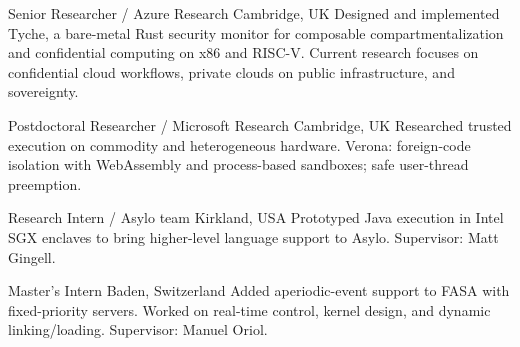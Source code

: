 

\cvposition
  {Senior Researcher / Azure Research}
  {Cambridge, UK}
  {}
  {Designed and implemented Tyche, a bare-metal Rust security monitor for composable
   compartmentalization and confidential computing on x86 and RISC-V.
   Current research focuses on confidential cloud workflows, private clouds on
   public infrastructure, and sovereignty.}

\cvposition
  {Postdoctoral Researcher / Microsoft Research}
  {Cambridge, UK}
  {}
  {Researched trusted execution on commodity and heterogeneous hardware.
   Verona: foreign-code isolation with WebAssembly and process-based sandboxes;
   safe user-thread preemption.}


\cvposition
  {Research Intern / Asylo team}
  {Kirkland, USA}
  {}
  {Prototyped Java execution in Intel SGX enclaves to bring higher-level language
   support to Asylo. Supervisor: Matt Gingell.}


\cvposition
  {Master's Intern}
  {Baden, Switzerland}
  {}
  {Added aperiodic-event support to FASA with fixed-priority servers.
   Worked on real-time control, kernel design, and dynamic linking/loading.
   Supervisor: Manuel Oriol.}
